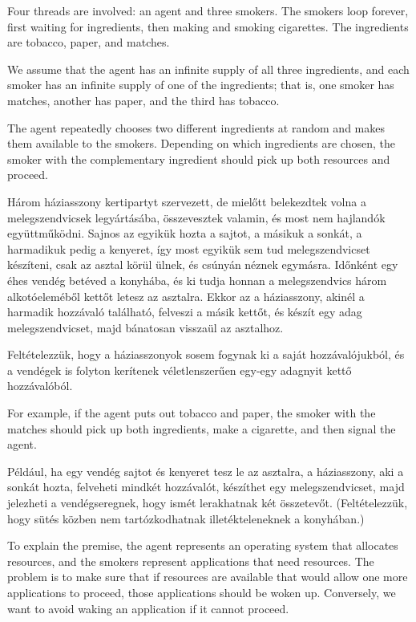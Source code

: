 \documentclass{book}
\begin{document}
Four threads are involved: an agent and three smokers.  The smokers
loop forever, first waiting for ingredients, then making and smoking
cigarettes.  The ingredients are tobacco, paper, and matches.

We assume that the agent has an infinite supply of all three
ingredients, and each smoker has an infinite supply of one of
the ingredients; that is, one smoker has matches, another has
paper, and the third has tobacco.

The agent repeatedly chooses two different ingredients at random
and makes them available to the smokers.  Depending on which
ingredients are chosen, the smoker with the complementary ingredient
should pick up both resources and proceed.

Három háziasszony kertipartyt szervezett, de mielőtt belekezdtek
volna a melegszendvicsek legyártásába, összevesztek valamin, és most
nem hajlandók együttműködni. Sajnos az egyikük hozta a sajtot, a másikuk a
sonkát, a harmadikuk pedig a kenyeret, így most egyikük sem tud
melegszendvicset készíteni, csak az asztal körül ülnek, és csúnyán néznek egymásra.
Időnként egy éhes vendég betéved a konyhába, és ki tudja honnan
a melegszendvics három alkotóeleméből kettőt letesz az asztalra.
Ekkor az a háziasszony, akinél a harmadik hozzávaló található, felveszi
a másik kettőt, és készít egy adag melegszendvicset, majd bánatosan
visszaül az asztalhoz.

Feltételezzük, hogy a háziasszonyok sosem fogynak ki a saját
hozzávalójukból, és a vendégek is folyton kerítenek véletlenszerűen
egy-egy adagnyit kettő hozzávalóból.

For example, if the agent puts out tobacco and paper, the
smoker with the matches should pick up both ingredients, make
a cigarette, and then signal the agent.


Például, ha egy vendég sajtot és kenyeret tesz le az asztalra,
a háziasszony, aki a sonkát hozta, felveheti mindkét
hozzávalót, készíthet egy melegszendvicset, majd jelezheti
a vendégseregnek, hogy ismét lerakhatnak két összetevőt.
(Feltételezzük, hogy sütés közben nem tartózkodhatnak illetékteleneknek
a konyhában.)

To explain the premise, the agent represents an operating system that
allocates resources, and the smokers represent applications that need
resources.  The problem is to make sure that if resources are
available that would allow one more applications to proceed,
those applications should be woken up.  Conversely, we want to avoid
waking an application if it cannot proceed.
\end{document}
